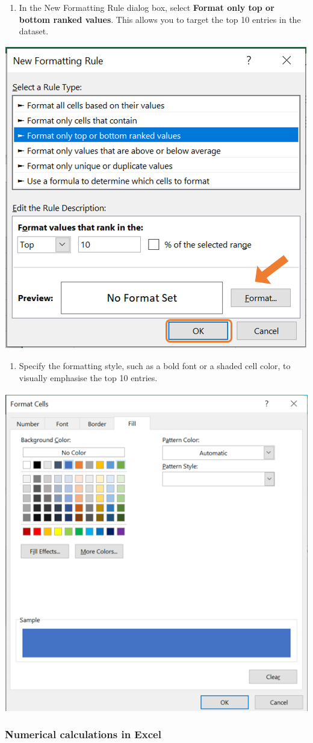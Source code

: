 \documentclass[
]{book}
\providecommand{\tightlist}{%
  \setlength{\itemsep}{0pt}\setlength{\parskip}{0pt}}
\begin{document}
\begin{enumerate}
\def\labelenumi{\arabic{enumi}.}
\setcounter{enumi}{2}
\tightlist
\item
  In the New Formatting Rule dialog box, select \textbf{Format only top or bottom ranked values}. This allows you to target the top 10 entries in the dataset.
\end{enumerate}

\begin{center}\includegraphics[width=0.4\linewidth]{Figures/manipulation_2_3} \end{center}

\newpage

\begin{enumerate}
\def\labelenumi{\arabic{enumi}.}
\setcounter{enumi}{3}
\tightlist
\item
  Specify the formatting style, such as a bold font or a shaded cell color, to visually emphasise the top 10 entries.
\end{enumerate}

\begin{center}\includegraphics[width=0.4\linewidth]{Figures/manipulation_2_4} \end{center}

\subsubsection*{Numerical calculations in Excel}\label{numerical-calculations-in-excel}
\end{document}
